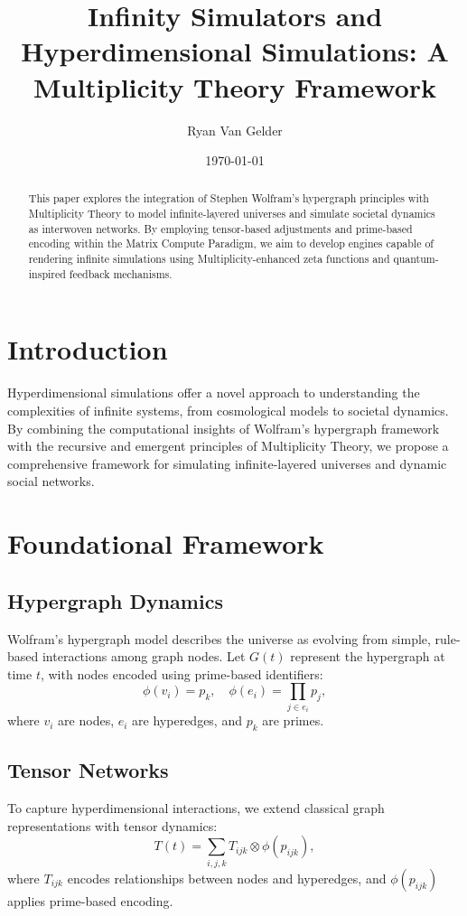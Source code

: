 \documentclass{article}
\theoremstyle{plain}
\begin{document}
\title{Infinity Simulators and Hyperdimensional Simulations: A Multiplicity Theory Framework}

\author{Ryan Van Gelder}
\date{\today}
\maketitle

\begin{abstract}
This paper explores the integration of Stephen Wolfram's hypergraph principles with Multiplicity Theory to model infinite-layered universes and simulate societal dynamics as interwoven networks. By employing tensor-based adjustments and prime-based encoding within the Matrix Compute Paradigm, we aim to develop engines capable of rendering infinite simulations using Multiplicity-enhanced zeta functions and quantum-inspired feedback mechanisms.
\end{abstract}

\section{Introduction}
Hyperdimensional simulations offer a novel approach to understanding the complexities of infinite systems, from cosmological models to societal dynamics. By combining the computational insights of Wolfram's hypergraph framework with the recursive and emergent principles of Multiplicity Theory, we propose a comprehensive framework for simulating infinite-layered universes and dynamic social networks.

\section{Foundational Framework}
\subsection{Hypergraph Dynamics}
Wolfram's hypergraph model describes the universe as evolving from simple, rule-based interactions among graph nodes. Let $G(t)$ represent the hypergraph at time $t$, with nodes encoded using prime-based identifiers:
\begin{equation}
\phi(v_i) = p_k, \quad \phi(e_i) = \prod_{j \in e_i} p_j,
\end{equation}
where $v_i$ are nodes, $e_i$ are hyperedges, and $p_k$ are primes.

\subsection{Tensor Networks}
To capture hyperdimensional interactions, we extend classical graph representations with tensor dynamics:
\begin{equation}
T(t) = \sum_{i,j,k} T_{ijk} \otimes \phi(p_{ijk}),
\end{equation}
where $T_{ijk}$ encodes relationships between nodes and hyperedges, and $\phi(p_{ijk})$ applies prime-based encoding.
\end{document}
